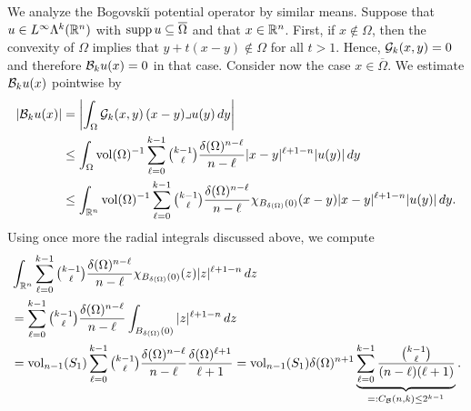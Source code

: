 \documentclass[10pt,a4paper]{article}
\begin{document}
We analyze the Bogovski\u{\i} potential operator by similar means. 
Suppose that $u \in L^{\infty}\Lambda^{k}({\mathbb R}^{n})$ with $\operatorname{supp} u \subseteq \overline\Omega$ and that $x \in {\mathbb R}^{n}$.
First, if $x \notin \Omega$, then the convexity of $\Omega$ implies that $y + t( x - y ) \notin \Omega$ for all $t > 1$. Hence, ${\mathcal G}_{k}(x,y) = 0$ and therefore ${\mathcal B}_{k} u(x) = 0$ in that case.
Consider now the case $x \in \overline\Omega$. 
We estimate ${\mathcal B}_{k} u(x)$ pointwise by 
\begin{align*}
    \left| {\mathcal B}_{k} u(x) \right|
    &=
    \left| 
        \int_{\Omega} {\mathcal G}_{k}(x,y) \,(x-y)\lrcorner u(y)\,dy
    \right| 
    \\&\leq 
    \int_{\Omega} \operatorname{vol}(\Omega)^{-1} \sum_{\ell=0}^{k-1}\tbinom{k-1}{\ell} \frac{ {\delta}(\Omega)^{n-\ell} }{n-\ell} |x-y|^{\ell+1-n} |u(y)| \,dy
    \\&\leq 
    \int_{{\mathbb R}^{n}} \operatorname{vol}(\Omega)^{-1} \sum_{\ell=0}^{k-1}\tbinom{k-1}{\ell} \frac{ {\delta}(\Omega)^{n-\ell} }{n-\ell} \chi_{B_{{\delta}(\Omega)}(0)}(x-y) |x-y|^{\ell+1-n} |u(y)| \,dy
    .
\end{align*}
Using once more the radial integrals discussed above, we compute 
\begin{align*}
    &
    \int_{{\mathbb R}^{n}} \sum_{\ell=0}^{k-1} \tbinom{k-1}{\ell} \frac{ {\delta}(\Omega)^{n-\ell} }{n-\ell} \chi_{B_{{\delta}(\Omega)}(0)}(z) |z|^{\ell+1-n} \,dz
    \\&
    =
    \sum_{\ell=0}^{k-1} \tbinom{k-1}{\ell} \frac{ {\delta}(\Omega)^{n-\ell} }{n-\ell} \int_{B_{{\delta}(\Omega)}(0)} |z|^{\ell+1-n} \,dz
    \\&
    =
    \operatorname{vol}_{n-1}(S_1) \sum_{\ell=0}^{k-1} \tbinom{k-1}{\ell} \frac{ {\delta}(\Omega)^{n-\ell} }{n-\ell} \frac{{\delta}(\Omega)^{\ell+1}}{\ell+1}
    =
    \operatorname{vol}_{n-1}(S_1) {\delta}(\Omega)^{n+1} \underbrace{ \sum_{\ell=0}^{k-1} \frac{ \tbinom{k-1}{\ell} }{ (n-\ell)(\ell+1) } }_{ =: C_{{\mathcal B}}(n,k) \leq 2^{k-1}}
    .
\end{align*}
\end{document}
